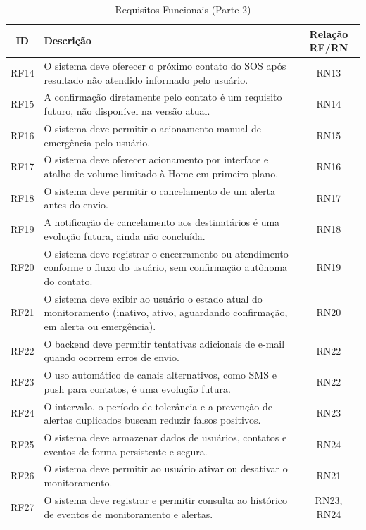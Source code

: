\begin{table}[H]
\caption{Requisitos Funcionais (Parte 2)}
\label{quad_rf2}
\centering
\begin{tabular}{|c|p{8cm}|c|}
\hline
\textbf{ID} & \textbf{Descrição} & \textbf{Relação RF/RN} \\
\hline
RF14 & O sistema deve oferecer o próximo contato do SOS após resultado não atendido informado pelo usuário. & RN13 \\
\hline
RF15 & A confirmação diretamente pelo contato é um requisito futuro, não disponível na versão atual. & RN14 \\
\hline
RF16 & O sistema deve permitir o acionamento manual de emergência pelo usuário. & RN15 \\
\hline
RF17 & O sistema deve oferecer acionamento por interface e atalho de volume limitado à Home em primeiro plano. & RN16 \\
\hline
RF18 & O sistema deve permitir o cancelamento de um alerta antes do envio. & RN17 \\
\hline
RF19 & A notificação de cancelamento aos destinatários é uma evolução futura, ainda não concluída. & RN18 \\
\hline
RF20 & O sistema deve registrar o encerramento ou atendimento conforme o fluxo do usuário, sem confirmação autônoma do contato. & RN19 \\
\hline
RF21 & O sistema deve exibir ao usuário o estado atual do monitoramento (inativo, ativo, aguardando confirmação, em alerta ou emergência). & RN20 \\
\hline
RF22 & O backend deve permitir tentativas adicionais de e-mail quando ocorrem erros de envio. & RN22 \\
\hline
RF23 & O uso automático de canais alternativos, como SMS e push para contatos, é uma evolução futura. & RN22 \\
\hline
RF24 & O intervalo, o período de tolerância e a prevenção de alertas duplicados buscam reduzir falsos positivos. & RN23 \\
\hline
RF25 & O sistema deve armazenar dados de usuários, contatos e eventos de forma persistente e segura. & RN24 \\
\hline
RF26 & O sistema deve permitir ao usuário ativar ou desativar o monitoramento. & RN21 \\
\hline
RF27 & O sistema deve registrar e permitir consulta ao histórico de eventos de monitoramento e alertas. & RN23, RN24 \\
\hline
\end{tabular}

\end{table}


